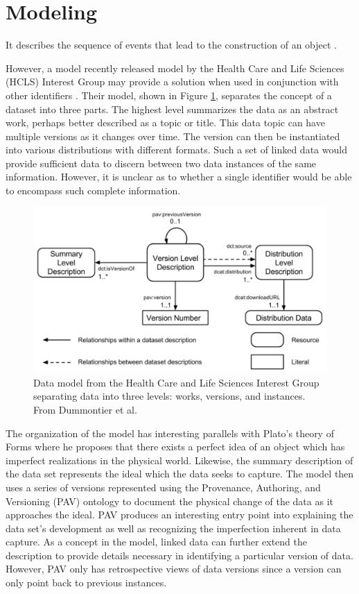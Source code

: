 \section{Modeling} \label{sec:models}

It describes the sequence of events that lead to the construction of an object  \cite{dai2014provenance}.

However, a model recently released model by the Health Care and Life Sciences (HCLS) Interest Group may provide a solution when used in conjunction with other identifiers \cite{Dummontier2016}.
Their model, shown in Figure \ref{HCLSModel}, separates the concept of a dataset into three parts.
The highest level summarizes the data as an abstract work, perhaps better described as a topic or title.
This data topic can have multiple versions as it changes over time.
The version can then be instantiated into various distributions with different formats.
Such a set of linked data would provide sufficient data to discern between two data instances of the same information.
However, it is unclear as to whether a single identifier would be able to encompass such complete information.

\begin{figure}%
	\centering
	\includegraphics[scale=0.35]{figures/HCLSModel.png}
	\caption{Data model from the Health Care and Life Sciences Interest Group separating data into three levels: works, versions, and instances.  From Dummontier et al. \cite{Dummontier2016}}
	\label{HCLSModel}
\end{figure}

The organization of the model has interesting parallels with Plato's theory of Forms where he proposes that there exists a perfect idea of an object which has imperfect realizations in the physical world.
Likewise, the summary description of the data set represents the ideal which the data seeks to capture.
The model then uses a series of versions represented using the Provenance, Authoring, and Versioning (PAV) ontology to document the physical change of the data as it approaches the ideal\cite{Ciccarese2013}.
PAV produces an interesting entry point into explaining the data set's development as well as recognizing the imperfection inherent in data capture.
As a concept in the model, linked data can further extend the description to provide details necessary in identifying a particular version of data.
However, PAV only has retrospective views of data versions since a version can only point back to previous instances.

